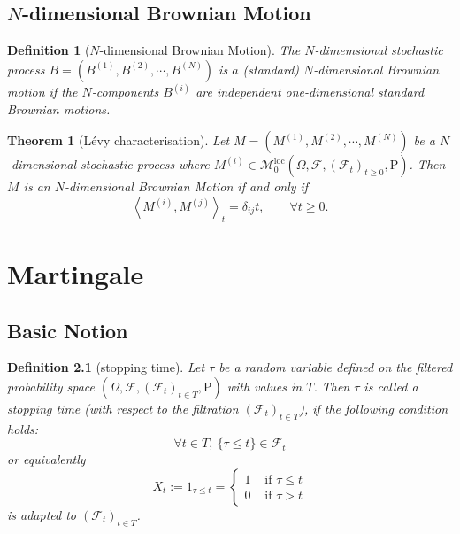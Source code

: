 \documentclass{report}
\newtheorem{definition}{Definition}[section]
\newtheorem{theorem}{Theorem}[section]
\theoremstyle{nonumberplain}
\begin{document}
\section{$N$-dimensional Brownian Motion}
\begin{definition}[$N$-dimensional Brownian Motion]
	The $N$-dimemsional stochastic process $B=\left(B^{(1)}, B^{(2)}, \cdots, B^{(N)}\right)$ is
	$a$ (standard) $N$-dimensional Brownian motion if the $N$-components $B^{(i)}$ are independent one-dimensional standard Brownian motions.
\end{definition}

\begin{theorem}[Lévy characterisation]
	Let $M=\left(M^{(1)}, M^{(2)}, \cdots, M^{(N)}\right)$ be a $N$-dimensional stochastic process where $M^{(i)}\in\mathscr{M}_0^{\mathrm{loc}}(\Omega,\mathcal{F},(\mathcal{F}_{t})_{t\ge0},\mathrm{P})$. Then $M$ is an $N$-dimensional Brownian Motion if and only if 
	\[
	\left\langle M^{(i)},M^{(j)}\right\rangle_t=\delta_{ij}t,\qquad\forall t\ge0.
	\]
\end{theorem}

\chapter{Martingale}
\section{Basic Notion}



\begin{definition}[stopping time]
Let $\tau$  be a random variable defined on the filtered probability space $(\Omega,\mathcal{F},(\mathcal{F}_{t})_{t\in T },\mathrm{P})$ with values in $T$. Then $\tau$  is called a \emph{stopping time} (with respect to the filtration $(\mathcal{F}_{t})_{t\in T}$), if the following condition holds:
\[
\forall t\in T,\ \{\tau \leq t\}\in {\mathcal {F}}_{t}
\]
or equivalently
\[
X_{t} :=1_{\tau\le t}=\left\{\begin{array}{ll}{1} & {\text { if }  \tau\le t } \\ {0} & {\text { if }\tau >t}\end{array}\right.
\]
is adapted to $(\mathcal{F}_{t})_{t\in T }$.
\end{definition}
\end{document}
